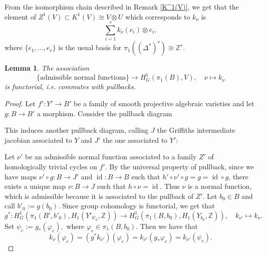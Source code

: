 \documentclass[a4paper,12 pt,titlepage,twoside]{book}
\newcommand{\numberset}{\mathbb}
\newcommand{\Z}{\numberset{Z}}
\DeclareMathOperator{\id}{id}
\DeclareMathOperator{\sing}{sing}
\DeclareMathOperator{\IH}{IH}
\theoremstyle{plain}
\theoremstyle{theorem}
\newtheorem{lemma}[thm]{Lemma}
\theoremstyle{definition}
\theoremstyle{remark}
\begin{document}
	\begin{center}
	\end{center}
	From the isomorphism chain described in Remark \ref{K^1(V)}, we get that the element of $Z^1(V) \subset K^1(V) \cong V \otimes U$ which corresponds to $k_\nu$ is $$\sum_{i=1}^r k_\nu(e_i) \otimes e_i,$$ where $\{e_1, \dots, e_r\}$ is the usual basis for $\pi_1((\Delta^*)^r) \cong \Z^r$.
	
	\begin{lemma}\label{lem: functoriality}
		The association $$\{\text{admissible normal functions}\} \rightarrow H^1_G(\pi_1(B), V), \quad \nu \mapsto k_\nu$$ is functorial, i.e. commutes with pullbacks.
	\end{lemma}
	\begin{proof}
		Let $f' \colon Y' \rightarrow B'$ be a family of smooth projective algebraic varieties and let $g \colon B \rightarrow B'$ a morphism. Consider the pullback diagram \begin{center}
		\end{center}
		This induces another pullback diagram, calling $J$ the Griffiths intermediate jacobian associated to $Y$ and $J'$ the one associated to $Y'$: 
		\begin{center}
		\end{center}
		Let $\nu'$ be an admissible normal function associated to a family $Z'$ of homologically trivial cycles on $f'$. By the universal property of pullback, since we have maps $\nu' \circ g \colon B \rightarrow J'$ and $\id \colon B \rightarrow B$ such that $h' \circ \nu' \circ g = g = \id \circ g$, there exists a unique map $\nu \colon B \rightarrow J$ such that $h \circ \nu =\id$. Thus $\nu$ is a normal function, which is admissible because it is associated to the pullback of $Z'$. Let $b_0 \in B$ and call $b'_0:= g(b_0)$. Since group cohomology is functorial, we get that $$g^* \colon H^1_G(\pi_1(B', b'_0), H_{1}(Y'_{b'_0}, \Z)) \rightarrow H^1_G(\pi_1(B,b_0), H_{1}(Y_{b_0}, \Z)), \quad k_{\nu'} \mapsto k_{\nu}.$$
		Set $\psi_e:= g_* (\varphi_e),$ where $\varphi_e \in \pi_1(B,b_0).$ Then we have that $$k_{\nu}(\varphi_e) = (g^*k_{\nu'})(\varphi_e) = k_{\nu'}(g_* \varphi_e) = k_{\nu'}(\psi_e).$$
	\end{proof}
\end{document}
